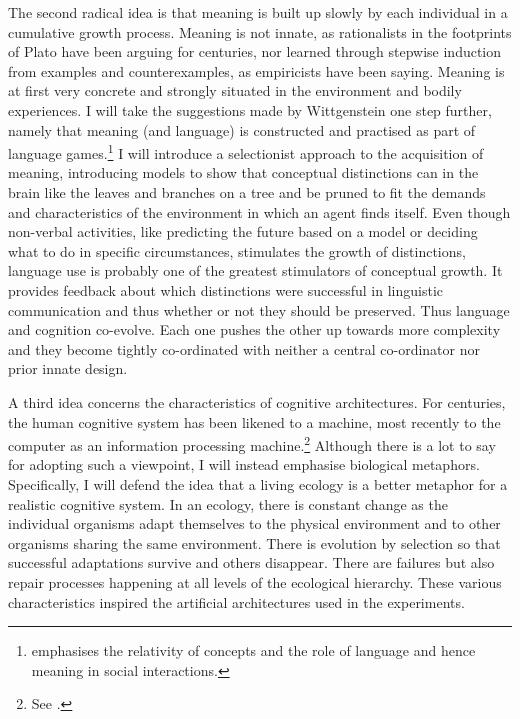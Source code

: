 The second radical idea is that 
meaning is built up slowly by each individual in a cumulative
growth process. Meaning is not innate, as rationalists in the 
footprints of Plato have been arguing for centuries, nor 
learned through stepwise
induction from examples and counterexamples, as empiricists
have been saying. Meaning is at first very concrete and
strongly situated in the environment and bodily experiences.
I will take the suggestions made
by Wittgenstein  one step further, namely that meaning (and language) is constructed
and practised as part of
language games.\footnote{\cite{Wittgenstein:1953} emphasises the relativity 
of concepts and the role of language and hence
meaning in social interactions.}
I will introduce a selectionist approach to
the acquisition of meaning, introducing models to 
show that conceptual distinctions can  in the brain
like the leaves and branches on a tree and be pruned to fit the
demands and characteristics of the environment in which
an agent finds itself. Even though non-verbal 
activities, like predicting the future based on a model 
or deciding what to do in specific circumstances, stimulates
the growth of distinctions, language use is probably one 
of the greatest stimulators of conceptual growth. It provides
feedback about which distinctions were successful in linguistic
communication and thus whether or not they should be preserved. 
Thus language and cognition co-evolve. Each one pushes the other 
up towards more complexity and they become tightly 
co-ordinated with neither a central co-ordinator nor prior innate design. 

A third idea concerns the characteristics of
cognitive architectures.
For centuries, the human cognitive system has been 
likened to a machine, most recently to the computer as 
an information processing machine.\footnote{See \cite{Newell:1976}.}
Although there is a lot to say for adopting such a 
viewpoint, I will instead emphasise biological metaphors. 
Specifically, I will defend the idea that a living ecology 
is a better metaphor for a realistic cognitive system. 
In an ecology, there is constant change as 
the individual organisms adapt themselves to the 
physical environment and to other organisms sharing 
the same environment. There is evolution by selection so 
that successful adaptations survive and others disappear. 
There are failures but also repair processes 
happening at all levels of the ecological 
hierarchy. These various characteristics inspired
the artificial architectures used in 
the experiments. 

